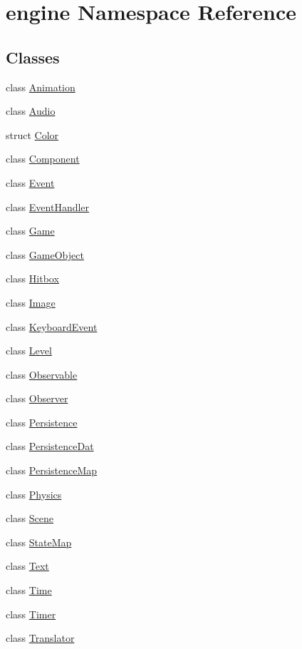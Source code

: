 \hypertarget{namespaceengine}{}\section{engine Namespace Reference}
\label{namespaceengine}
\subsection*{Classes}
\begin{DoxyCompactItemize}
\item 
class \hyperlink{classengine_1_1_animation}{Animation}
\item 
class \hyperlink{classengine_1_1_audio}{Audio}
\item 
struct \hyperlink{structengine_1_1_color}{Color}
\item 
class \hyperlink{classengine_1_1_component}{Component}
\item 
class \hyperlink{classengine_1_1_event}{Event}
\item 
class \hyperlink{classengine_1_1_event_handler}{Event\+Handler}
\item 
class \hyperlink{classengine_1_1_game}{Game}
\item 
class \hyperlink{classengine_1_1_game_object}{Game\+Object}
\item 
class \hyperlink{classengine_1_1_hitbox}{Hitbox}
\item 
class \hyperlink{classengine_1_1_image}{Image}
\item 
class \hyperlink{classengine_1_1_keyboard_event}{Keyboard\+Event}
\item 
class \hyperlink{classengine_1_1_level}{Level}
\item 
class \hyperlink{classengine_1_1_observable}{Observable}
\item 
class \hyperlink{classengine_1_1_observer}{Observer}
\item 
class \hyperlink{classengine_1_1_persistence}{Persistence}
\item 
class \hyperlink{classengine_1_1_persistence_dat}{Persistence\+Dat}
\item 
class \hyperlink{classengine_1_1_persistence_map}{Persistence\+Map}
\item 
class \hyperlink{classengine_1_1_physics}{Physics}
\item 
class \hyperlink{classengine_1_1_scene}{Scene}
\item 
class \hyperlink{classengine_1_1_state_map}{State\+Map}
\item 
class \hyperlink{classengine_1_1_text}{Text}
\item 
class \hyperlink{classengine_1_1_time}{Time}
\item 
class \hyperlink{classengine_1_1_timer}{Timer}
\item 
class \hyperlink{classengine_1_1_translator}{Translator}
\end{DoxyCompactItemize}
